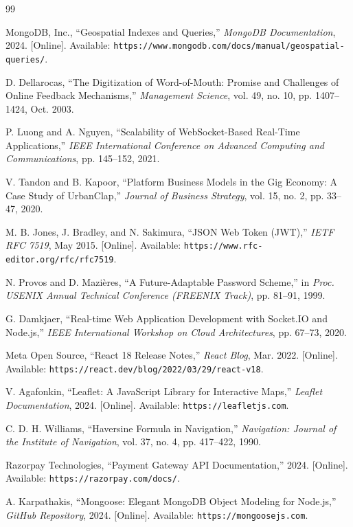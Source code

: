 \documentclass[12pt,a4paper]{report}
\begin{document}
\begin{thebibliography}{99}

MongoDB, Inc., ``Geospatial Indexes and Queries,'' \textit{MongoDB Documentation}, 2024. [Online]. Available: \texttt{https://www.mongodb.com/docs/manual/geospatial-queries/}.

D. Dellarocas, ``The Digitization of Word-of-Mouth: Promise and Challenges of Online Feedback Mechanisms,'' \textit{Management Science}, vol. 49, no. 10, pp. 1407--1424, Oct. 2003.

P. Luong and A. Nguyen, ``Scalability of WebSocket-Based Real-Time Applications,'' \textit{IEEE International Conference on Advanced Computing and Communications}, pp. 145--152, 2021.

V. Tandon and B. Kapoor, ``Platform Business Models in the Gig Economy: A Case Study of UrbanClap,'' \textit{Journal of Business Strategy}, vol. 15, no. 2, pp. 33--47, 2020.

M. B. Jones, J. Bradley, and N. Sakimura, ``JSON Web Token (JWT),'' \textit{IETF RFC 7519}, May 2015. [Online]. Available: \texttt{https://www.rfc-editor.org/rfc/rfc7519}.

N. Provos and D. Mazières, ``A Future-Adaptable Password Scheme,'' in \textit{Proc. USENIX Annual Technical Conference (FREENIX Track)}, pp. 81--91, 1999.

G. Damkjaer, ``Real-time Web Application Development with Socket.IO and Node.js,'' \textit{IEEE International Workshop on Cloud Architectures}, pp. 67--73, 2020.

Meta Open Source, ``React 18 Release Notes,'' \textit{React Blog}, Mar. 2022. [Online]. Available: \texttt{https://react.dev/blog/2022/03/29/react-v18}.

V. Agafonkin, ``Leaflet: A JavaScript Library for Interactive Maps,'' \textit{Leaflet Documentation}, 2024. [Online]. Available: \texttt{https://leafletjs.com}.

C. D. H. Williams, ``Haversine Formula in Navigation,'' \textit{Navigation: Journal of the Institute of Navigation}, vol. 37, no. 4, pp. 417--422, 1990.

Razorpay Technologies, ``Payment Gateway API Documentation,'' 2024. [Online]. Available: \texttt{https://razorpay.com/docs/}.

A. Karpathakis, ``Mongoose: Elegant MongoDB Object Modeling for Node.js,'' \textit{GitHub Repository}, 2024. [Online]. Available: \texttt{https://mongoosejs.com}.


\end{thebibliography}
\end{document}
